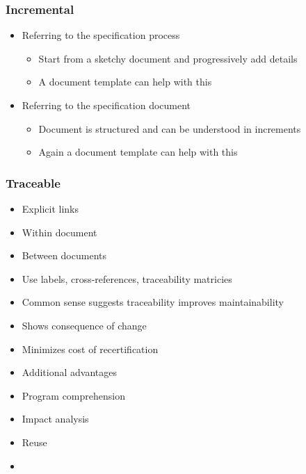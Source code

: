 \documentclass[t,12pt,numbers,fleqn]{beamer}
\newcounter{temp}
\begin{document}

\begin{frame}
\frametitle{Incremental}

\begin{itemize}

\item Referring to the specification process
\begin{itemize}
\item Start from a sketchy document and progressively add details
\item A document template can help with this
\end{itemize}
\item Referring to the specification document
\begin{itemize}
\item Document is structured and can be understood in increments
\item Again a document template can help with this
\end{itemize}

\end{itemize}

\end{frame}


\begin{frame}
\frametitle{Traceable}

\begin{itemize}

\item Explicit links
\bi
\item Within document
\item Between documents
\ei
\item Use labels, cross-references, traceability matricies
\item Common sense suggests traceability improves maintainability
\item Shows consequence of change
\item Minimizes cost of recertification
\item Additional advantages
\bi
\item Program comprehension
\item Impact analysis
\item Reuse
\ei
\item {} %
\end{itemize}

\end{frame}
\end{document}
